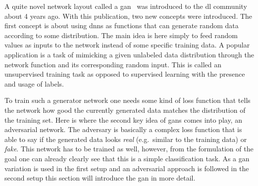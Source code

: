 \label{sssec:gan}

A quite novel network layout called a \gls{gan}~\cite{gan} was introduced to the \gls{dl} community about 4 years ago. With this publication, two new concepts were introduced. The first concept is about using \glspl{dnn} as functions that can generate random data according to some distribution. The main idea is here simply to feed random values as inputs to the network instead of some specific training data. A popular application is a task of mimicking a given unlabeled data distribution through the network function and its corresponding random input. This is called an unsupervised training task as opposed to supervised learning with the presence and usage of labels.

To train such a generator network one needs some kind of loss function that tells the network how good the currently generated data matches the distribution of the training set. Here is where the second key idea of \glspl{gan} comes into play, an adversarial network. The adversary is basically a complex loss function that is able to say if the generated data looks \emph{real} (e.g.\ similar to the training data) or \emph{fake}. This network has to be trained as well, however, from the formulation of the goal one can already clearly see that this is a simple classification task. As a \gls{gan} variation is used in the first setup and an adversarial approach is followed in the second setup this section will introduce the \gls{gan} in more detail.

